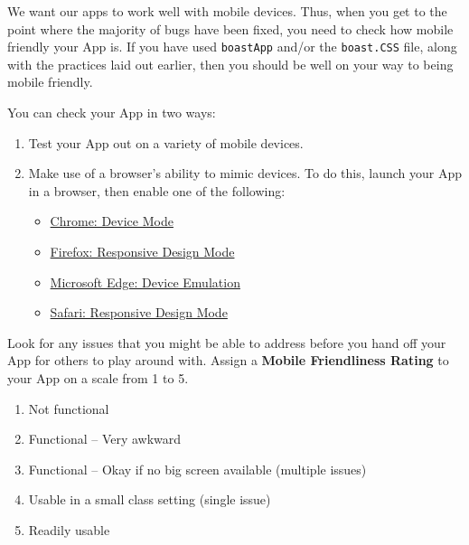 \documentclass[]{book}
\providecommand{\tightlist}{%
  \setlength{\itemsep}{0pt}\setlength{\parskip}{0pt}}
\begin{document}
We want our apps to work well with mobile devices. Thus, when you get to the point where the majority of bugs have been fixed, you need to check how mobile friendly your App is. If you have used \texttt{boastApp} and/or the \texttt{boast.CSS} file, along with the practices laid out earlier, then you should be well on your way to being mobile friendly.

You can check your App in two ways:

\begin{enumerate}
\def\labelenumi{\arabic{enumi}.}
\tightlist
\item
  Test your App out on a variety of mobile devices.
\item
  Make use of a browser's ability to mimic devices. To do this, launch your App in a browser, then enable one of the following:

  \begin{itemize}
  \tightlist
  \item
    \href{https://developers.google.com/web/tools/chrome-devtools/device-mode/\#viewport}{Chrome: Device Mode}
  \item
    \href{https://developer.mozilla.org/en-US/docs/Tools/Responsive_Design_Mode}{Firefox: Responsive Design Mode}
  \item
    \href{https://docs.microsoft.com/en-us/microsoft-edge/devtools-guide/emulation}{Microsoft Edge: Device Emulation}
  \item
    \href{https://support.apple.com/en-gb/guide/safari-developer/dev84bd42758/mac}{Safari: Responsive Design Mode}
  \end{itemize}
\end{enumerate}

Look for any issues that you might be able to address before you hand off your App for others to play around with. Assign a \textbf{Mobile Friendliness Rating} to your App on a scale from 1 to 5.

\begin{enumerate}
\def\labelenumi{\arabic{enumi}.}
\tightlist
\item
  Not functional
\item
  Functional -- Very awkward
\item
  Functional -- Okay if no big screen available (multiple issues)
\item
  Usable in a small class setting (single issue)
\item
  Readily usable
\end{enumerate}
\end{document}
